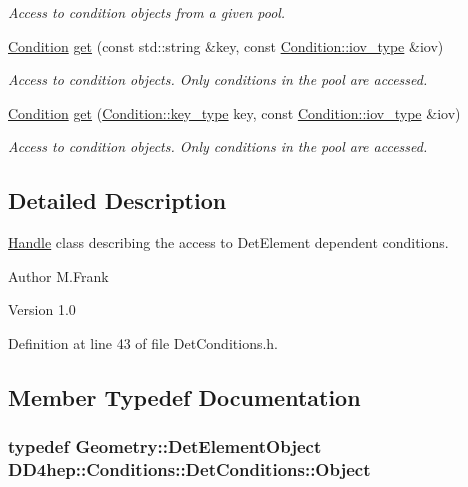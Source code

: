 \begin{DoxyCompactItemize}
\begin{DoxyCompactList}\small\item\em Access to condition objects from a given pool. \item\end{DoxyCompactList}\item 
\hyperlink{class_d_d4hep_1_1_conditions_1_1_condition}{Condition} \hyperlink{class_d_d4hep_1_1_conditions_1_1_det_conditions_a0bb1e77e051b8fc167a54dadbed90ca1}{get} (const std::string \&key, const \hyperlink{class_d_d4hep_1_1_i_o_v}{Condition::iov\_\-type} \&iov)
\begin{DoxyCompactList}\small\item\em Access to condition objects. Only conditions in the pool are accessed. \item\end{DoxyCompactList}\item 
\hyperlink{class_d_d4hep_1_1_conditions_1_1_condition}{Condition} \hyperlink{class_d_d4hep_1_1_conditions_1_1_det_conditions_a27faa309035740b80ff2053fff6f30ba}{get} (\hyperlink{class_d_d4hep_1_1_conditions_1_1_condition_a7528efa762e8cc072ef80ea67c3531f9}{Condition::key\_\-type} key, const \hyperlink{class_d_d4hep_1_1_i_o_v}{Condition::iov\_\-type} \&iov)
\begin{DoxyCompactList}\small\item\em Access to condition objects. Only conditions in the pool are accessed. \item\end{DoxyCompactList}\end{DoxyCompactItemize}


\subsection{Detailed Description}
\hyperlink{class_d_d4hep_1_1_handle}{Handle} class describing the access to DetElement dependent conditions. \begin{DoxyAuthor}{Author}
M.Frank 
\end{DoxyAuthor}
\begin{DoxyVersion}{Version}
1.0 
\end{DoxyVersion}


Definition at line 43 of file DetConditions.h.

\subsection{Member Typedef Documentation}
\hypertarget{class_d_d4hep_1_1_conditions_1_1_det_conditions_a4c0ad456b1967b5b724894f23ef63dec}{
\subsubsection[{Object}]{\setlength{\rightskip}{0pt plus 5cm}typedef {\bf Geometry::DetElementObject} {\bf DD4hep::Conditions::DetConditions::Object}}}
\label{class_d_d4hep_1_1_conditions_1_1_det_conditions_a4c0ad456b1967b5b724894f23ef63dec}


